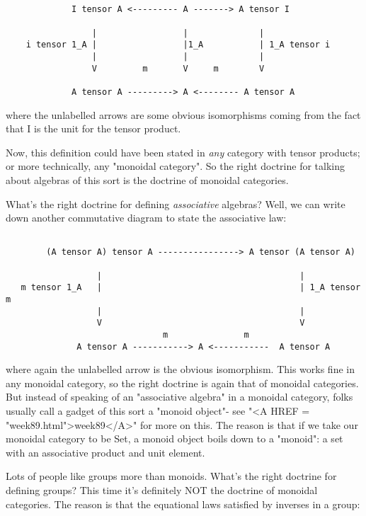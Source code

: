\begin{verbatim}


             I tensor A <--------- A -------> A tensor I

                 |                 |              |
    i tensor 1_A |                 |1_A           | 1_A tensor i
                 |                 |              |
                 V         m       V     m        V

             A tensor A ---------> A <-------- A tensor A              

\end{verbatim}
    
where the unlabelled arrows are some obvious isomorphisms coming from
the fact that I is the unit for the tensor product.  

Now, this definition could have been stated in \emph{any} category with 
tensor products; or more technically, any "monoidal category".  So 
the right doctrine for talking about algebras of this sort is the
doctrine of monoidal categories.  

What's the right doctrine for defining \emph{associative} algebras?  Well, we
can write down another commutative diagram to state the associative
law:


\begin{verbatim}

        (A tensor A) tensor A ----------------> A tensor (A tensor A)

                  |                                       |
   m tensor 1_A   |                                       | 1_A tensor m
                  |                                       |
                  V                                       V
                               m               m
              A tensor A -----------> A <-----------  A tensor A
\end{verbatim}
    

where again the unlabelled arrow is the obvious isomorphism.  This works
fine in any monoidal category, so the right doctrine is again that of
monoidal categories.  But instead of speaking of an "associative
algebra" in a monoidal category, folks usually call a gadget of
this sort a "monoid object"- see "<A HREF =
"week89.html">week89</A>" for more on this.  The reason is that if
we take our monoidal category to be Set, a monoid object boils down to a
"monoid": a set with an associative product and unit element.

Lots of people like groups more than monoids.   What's the right
doctrine for defining groups?  This time it's definitely NOT the
doctrine of monoidal categories.  The reason is that the equational
laws satisfied by inverses in a group:

